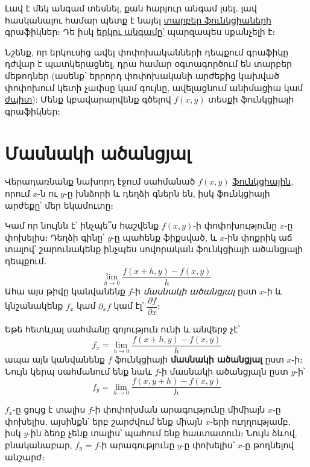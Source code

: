 Լավ է մեկ անգամ տեսնել, քան հարյուր անգամ լսել․ լավ հասկանալու համար պետք է նայել \href{https://www.khanacademy.org/math/multivariable-calculus/thinking-about-multivariable-function/ways-to-represent-multivariable-functions/a/multidimensional-graphs}{տարբեր ֆունկցիաների} գրաֆիկներ։ Դե իսկ \href{https://www.intmath.com/vectors/3d-grapher.php}{երկու անգամը՝} պարզապես սքանչելի է։

Նշենք, որ երկուսից ավել փոփոխականների դեպքում գրաֆիկը դժվար է պատկերացնել, դրա համար օգտագործում են տարբեր մեթոդ\-ներ (ասենք՝ երրորդ փոփոխականի արժեքից կախված փոփոխում կետի չափսը կամ գույնը, ավելացնում անիմացիա կամ \href{https://en.wikipedia.org/wiki/Chernoff_face}{ժպիտ}): Մենք կբավարարվենք գծելով $f(x,y)$ տեսքի ֆունկցիայի գրաֆիկներ։


\section{Մասնակի ածանցյալ}

Վերադառնանք նախորդ էջում սահմանած $f(x, y)$
\hyperref[3d_graph]{\color{OliveGreen}ֆունկցիային}, որում $x$-ն ու $y$-ը խնձորի և դեղձի գներն են, իսկ ֆունկցիայի արժեքը՝ մեր եկամուտը։ 


Կամ որ նույնն է՝ ինչպե՞ս հաշվենք $f(x,y)$-ի փոփոխությունը $x$-ը փոխելիս։ Դեղձի գինը՝ $y$-ը պահենք ֆիքսված, և $x$-ին փոքրիկ աճ տալով՝ շարունակենք ինչպես սովորական ֆունկցիայի ածանցյալի դեպքում․
\[
\lim_{h \to 0} \frac{f(x + h, y) - f(x, y)}{h}
\]
Ահա այս թիվը կանվանենք $f$-ի \textit{մասնակի ածանցյալ} ըստ $x$-ի և կնշանակենք $f_x$ կամ $\partial_x f$ կամ էլ՝ $\dfrac{\partial f}{\partial x}$։

\begin{definition}
Եթե հետևյալ սահմանը գոյություն ունի և անվերջ չէ՝
\[
f_x = \lim_{{h \to 0}} \frac{f(x + h, y) - f(x, y)}{h}
\]
ապա այն կանվանենք $f$ ֆունկցիայի \textbf{մասնակի ածանցյալ} ըստ $x$-ի։ Նույն կերպ սահմանում ենք նաև $f$-ի մասնակի ածանցյալն ըստ $y$-ի՝
\[
f_y = \lim_{{h \to 0}} \frac{f(x,y + h) - f(x, y)}{h}
\]
\end{definition}

$f_x$-ը ցույց է տալիս $f$-ի փոփոխման արագությունը միմիայն $x$-ը փոխելիս, այսինքն՝ երբ շարժվում ենք միայն $x$-երի ուղղությամբ, իսկ $y$-ին ձեռք չենք տալիս՝ պահում ենք հաստատուն։ Նույն ձևով, բնականաբար, $f_y$ = $f$-ի արագությունը $y$-ը փոխելիս՝ $x$-ը թողնելով անշարժ։

